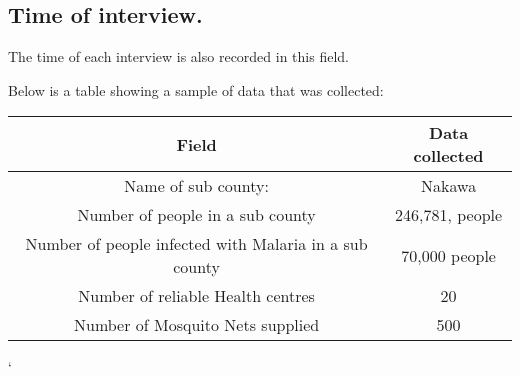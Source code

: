 \documentclass[a4paper,12pt]{article}
\begin{document}
\subsection{Time of interview.}
The time of each interview is also recorded in this field.

Below is a table showing a sample of data that was collected:

\begin{center}
\begin{tabular}{|c|c|}
\hline
Field & Data collected  \\ [0.5ex]
\hline
Name of sub county:  & Nakawa   \\ [0.5ex]
\hline
Number of people in a sub county & 246,781, people   \\ [0.5ex]
\hline
Number of people infected with Malaria in a sub county & 70,000 people \\ [0.5ex]
\hline
Number of reliable Health centres & 20  \\ [0.5ex]
\hline
Number of Mosquito Nets supplied &500  \\ [0.5ex]
\hline
\end{tabular}
\end{center}`
\end{document}
